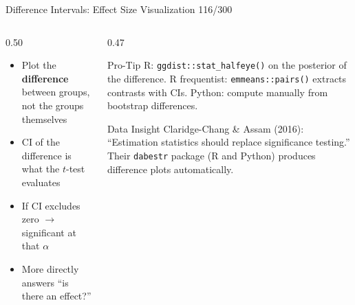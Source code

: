 \documentclass[10pt]{beamer}
\newcommand{\smark}[1]{\hfill{\scriptsize\color{codegray}#1}}
\begin{document}
\begin{frame}{Difference Intervals: Effect Size Visualization}
\smark{116/300}
\begin{columns}[T]
\begin{column}{0.50\textwidth}
\begin{itemize}
    \item Plot the \textbf{difference} between groups, not the groups themselves
    \item CI of the difference is what the $t$-test evaluates
    \item If CI excludes zero $\to$ significant at that $\alpha$
    \item More directly answers ``is there an effect?''
\end{itemize}
\end{column}
\begin{column}{0.47\textwidth}
\begin{alertblock}{Pro-Tip}
    \scriptsize R: \texttt{ggdist::stat\_halfeye()} on the posterior of the difference. R frequentist: \texttt{emmeans::pairs()} extracts contrasts with CIs. Python: compute manually from bootstrap differences.
\end{alertblock}
\vspace{0.1cm}
\begin{exampleblock}{Data Insight}
    \scriptsize Claridge-Chang \& Assam (2016): ``Estimation statistics should replace significance testing.'' Their \texttt{dabestr} package (R and Python) produces difference plots automatically.
\end{exampleblock}
\end{column}
\end{columns}
\end{frame}
\end{document}
